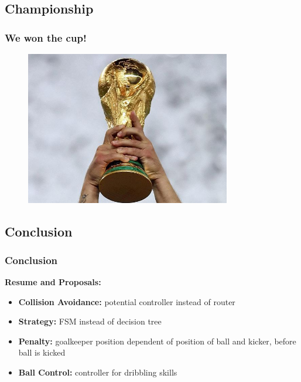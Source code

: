 \documentclass[hyperref={pdfpagelabels=false},compress]{beamer}
\begin{document}
\subsection{Championship}
\begin{frame}
	\frametitle{We won the cup!}
	\begin{center}
	    \begin{figure}
	        \includegraphics[width=0.8\textwidth]{wm}
	    \end{figure}
	\end{center}
\end{frame}

\subsection{Conclusion}
\begin{frame}
	\frametitle{Conclusion}
	\textbf{Resume and Proposals:}\\
	\begin{itemize}
		\item \textbf{Collision Avoidance:} potential controller instead of router
		\item \textbf{Strategy:} FSM instead of decision tree
		\item \textbf{Penalty:} goalkeeper position dependent of position of ball and kicker, before ball is kicked
		\item \textbf{Ball Control:} controller for dribbling skills
	\end{itemize}
\end{frame}
\end{document}

